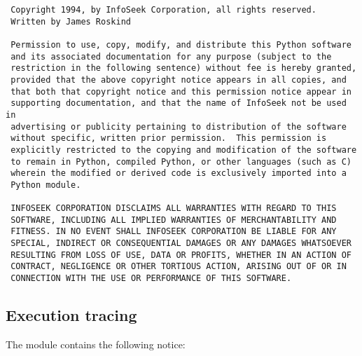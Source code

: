 \begin{verbatim}
 Copyright 1994, by InfoSeek Corporation, all rights reserved.
 Written by James Roskind

 Permission to use, copy, modify, and distribute this Python software
 and its associated documentation for any purpose (subject to the
 restriction in the following sentence) without fee is hereby granted,
 provided that the above copyright notice appears in all copies, and
 that both that copyright notice and this permission notice appear in
 supporting documentation, and that the name of InfoSeek not be used in
 advertising or publicity pertaining to distribution of the software
 without specific, written prior permission.  This permission is
 explicitly restricted to the copying and modification of the software
 to remain in Python, compiled Python, or other languages (such as C)
 wherein the modified or derived code is exclusively imported into a
 Python module.

 INFOSEEK CORPORATION DISCLAIMS ALL WARRANTIES WITH REGARD TO THIS
 SOFTWARE, INCLUDING ALL IMPLIED WARRANTIES OF MERCHANTABILITY AND
 FITNESS. IN NO EVENT SHALL INFOSEEK CORPORATION BE LIABLE FOR ANY
 SPECIAL, INDIRECT OR CONSEQUENTIAL DAMAGES OR ANY DAMAGES WHATSOEVER
 RESULTING FROM LOSS OF USE, DATA OR PROFITS, WHETHER IN AN ACTION OF
 CONTRACT, NEGLIGENCE OR OTHER TORTIOUS ACTION, ARISING OUT OF OR IN
 CONNECTION WITH THE USE OR PERFORMANCE OF THIS SOFTWARE.
\end{verbatim}



\subsection{Execution tracing}

The  module contains the following notice:

